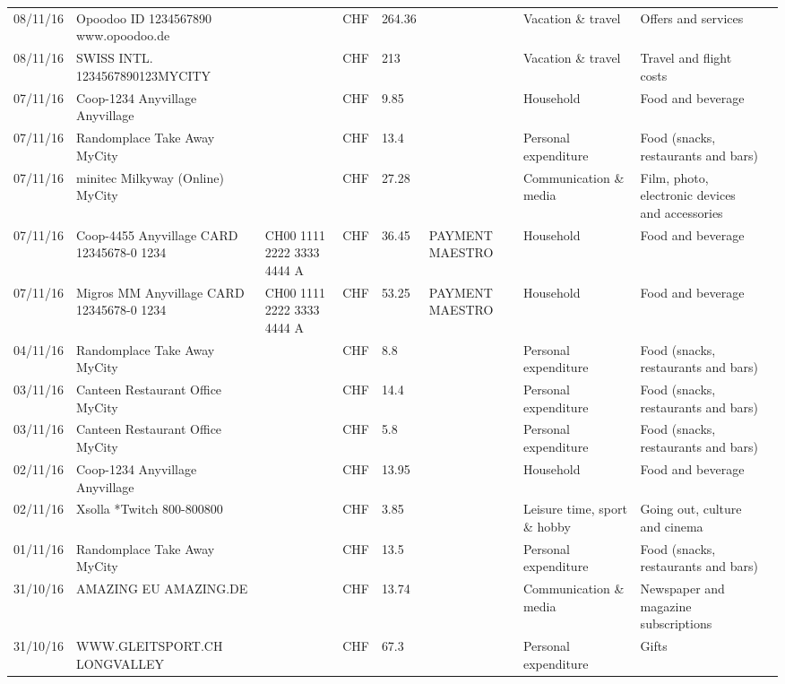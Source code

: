 \begin{landscape}
\begin{tiny}
\begin{longtable}{lp{4cm}llllp{3cm}ll}
		    08/11/16 & Opoodoo ID 1234567890      www.opoodoo.de &       & CHF   & 264.36 &       & Vacation \& travel & Offers and services \\
		    08/11/16 & SWISS INTL. 1234567890123MYCITY &       & CHF   & 213   &       & Vacation \& travel & Travel and flight costs \\
		    07/11/16 & Coop-1234 Anyvillage    Anyvillage &       & CHF   & 9.85  &       & Household & Food and beverage \\
		    07/11/16 & Randomplace Take Away     MyCity &       & CHF   & 13.4  &       & Personal expenditure & Food (snacks, restaurants and bars) \\
		    07/11/16 & minitec Milkyway (Online) MyCity &       & CHF   & 27.28 &       & Communication \& media & Film, photo, electronic devices and accessories \\
		    07/11/16 & Coop-4455 Anyvillage CARD 12345678-0 1234 & CH00 1111 2222 3333 4444 A & CHF   & 36.45 & PAYMENT MAESTRO & Household & Food and beverage \\
		    07/11/16 & Migros MM Anyvillage CARD 12345678-0 1234 & CH00 1111 2222 3333 4444 A & CHF   & 53.25 & PAYMENT MAESTRO & Household & Food and beverage \\
		    04/11/16 & Randomplace Take Away     MyCity &       & CHF   & 8.8   &       & Personal expenditure & Food (snacks, restaurants and bars) \\
		    03/11/16 & Canteen Restaurant Office      MyCity &       & CHF   & 14.4  &       & Personal expenditure & Food (snacks, restaurants and bars) \\
		    03/11/16 & Canteen Restaurant Office      MyCity &       & CHF   & 5.8   &       & Personal expenditure & Food (snacks, restaurants and bars) \\
		    02/11/16 & Coop-1234 Anyvillage    Anyvillage &       & CHF   & 13.95 &       & Household & Food and beverage \\
		    02/11/16 & Xsolla *Twitch           800-800800 &       & CHF   & 3.85  &       & Leisure time, sport \& hobby & Going out, culture and cinema \\
		    01/11/16 & Randomplace Take Away     MyCity &       & CHF   & 13.5  &       & Personal expenditure & Food (snacks, restaurants and bars) \\
		    31/10/16 & AMAZING EU                AMAZING.DE &       & CHF   & 13.74 &       & Communication \& media & Newspaper and magazine subscriptions \\
		    31/10/16 & WWW.GLEITSPORT.CH         LONGVALLEY &       & CHF   & 67.3  &       & Personal expenditure & Gifts \\

\end{longtable}
\end{tiny}
\end{landscape}
